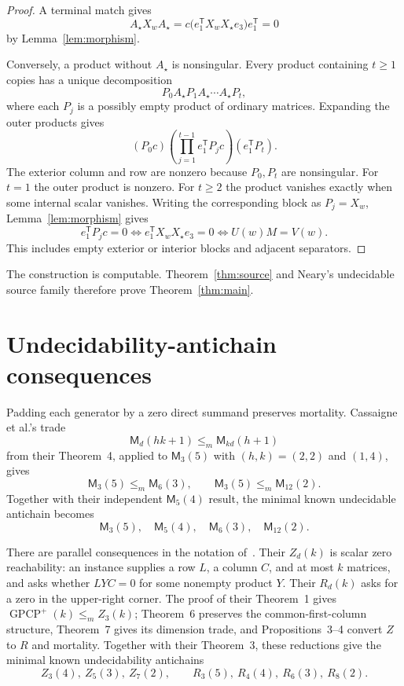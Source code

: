 \documentclass[11pt]{article}
\newcommand{\Mort}{\mathsf{M}}
\begin{document}
\begin{proof}
A terminal match gives
\[
  A_\star X_w A_\star
  =c\bigl(e_1^{\mathsf T}X_wX_\star e_3\bigr)e_1^{\mathsf T}=0
\]
by Lemma~\ref{lem:morphism}.

Conversely, a product without $A_\star$ is nonsingular.  Every product containing $t\geq1$
copies has a unique decomposition
\[
  P_0A_\star P_1A_\star\cdots A_\star P_t,
\]
where each $P_j$ is a possibly empty product of ordinary matrices.  Expanding the outer
products gives
\[
 (P_0c)\left(\prod_{j=1}^{t-1}e_1^{\mathsf T}P_jc\right)
 (e_1^{\mathsf T}P_t).
\]
The exterior column and row are nonzero because $P_0,P_t$ are nonsingular.  For $t=1$ the
outer product is nonzero.  For $t\geq2$ the product vanishes exactly when some internal
scalar vanishes.  Writing the corresponding block as $P_j=X_w$, Lemma~\ref{lem:morphism}
gives
\[
 e_1^{\mathsf T}P_jc=0
 \Longleftrightarrow e_1^{\mathsf T}X_wX_\star e_3=0
 \Longleftrightarrow U(w)M=V(w).
\]
This includes empty exterior or interior blocks and adjacent separators.
\end{proof}

The construction is computable.  Theorem~\ref{thm:source} and Neary's undecidable source
family therefore prove Theorem~\ref{thm:main}.

\section{Undecidability-antichain consequences}

Padding each generator by a zero direct summand preserves mortality.  Cassaigne et al.'s
trade
\[
  \Mort_d(hk+1)\leq_m\Mort_{kd}(h+1)
\]
from their Theorem~4, applied to $\Mort_3(5)$ with $(h,k)=(2,2)$ and $(1,4)$, gives
\[
  \Mort_3(5)\leq_m\Mort_6(3),\qquad
  \Mort_3(5)\leq_m\Mort_{12}(2).
\]
Together with their independent $\Mort_5(4)$ result, the minimal known undecidable antichain
becomes
\[
  \boxed{\Mort_3(5),\quad\Mort_5(4),\quad\Mort_6(3),\quad\Mort_{12}(2)}.
\]

There are parallel consequences in the notation of~\cite{CHHN14}.  Their $Z_d(k)$ is scalar
zero reachability: an instance supplies a row $L$, a column $C$, and at most $k$ matrices,
and asks whether $LYC=0$ for some nonempty product $Y$.  Their $R_d(k)$ asks for a zero in
the upper-right corner.  The proof of their Theorem~1 gives
$\operatorname{GPCP}^{+}(k)\leq_m Z_3(k)$; Theorem~6 preserves the common-first-column
structure, Theorem~7 gives its dimension trade, and Propositions~3--4 convert $Z$ to $R$
and mortality.  Together with their Theorem~3, these reductions give the minimal known
undecidability antichains
\[
  Z_3(4),\ Z_5(3),\ Z_7(2),
  \qquad
  R_3(5),\ R_4(4),\ R_6(3),\ R_8(2).
\]
\end{document}
